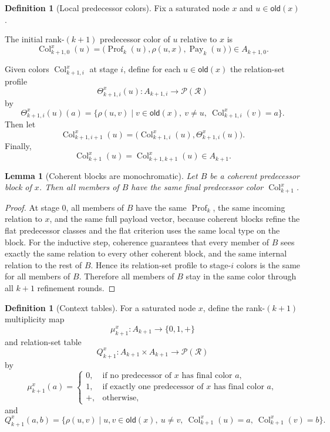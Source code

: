 \documentclass[11pt]{article}
\newtheorem{lemma}[theorem]{Lemma}
\theoremstyle{definition}
\newtheorem{definition}[theorem]{Definition}
\newcommand{\Roles}{\mathcal{R}}
\newcommand{\Prof}{\operatorname{Prof}}
\newcommand{\older}{\mathsf{old}}
\newcommand{\Col}{\operatorname{Col}}
\newcommand{\Pay}{\operatorname{Pay}}
\begin{document}
\begin{definition}[Local predecessor colors]
Fix a saturated node $x$ and $u\in\older(x)$.

The initial rank-$(k+1)$ predecessor color of $u$ relative to $x$ is
\[
\Col^x_{k+1,0}(u)=\bigl(\Prof_k(u),\rho(u,x),\Pay_k(u)\bigr)\in A_{k+1,0}.
\]

Given colors $\Col^x_{k+1,i}$ at stage $i$, define for each $u\in\older(x)$ the relation-set profile
\[
\Theta^x_{k+1,i}(u):A_{k+1,i}\to \mathcal P(\Roles)
\]
by
\[
\Theta^x_{k+1,i}(u)(a)=\{\rho(u,v)\mid v\in\older(x),\ v\neq u,\ \Col^x_{k+1,i}(v)=a\}.
\]
Then let
\[
\Col^x_{k+1,i+1}(u)=\bigl(\Col^x_{k+1,i}(u),\Theta^x_{k+1,i}(u)\bigr).
\]
Finally,
\[
\Col^x_{k+1}(u)=\Col^x_{k+1,k+1}(u)\in A_{k+1}.
\]
\end{definition}

\begin{lemma}[Coherent blocks are monochromatic]
Let $B$ be a coherent predecessor block of $x$. Then all members of $B$ have the same final predecessor color $\Col^x_{k+1}$.
\end{lemma}

\begin{proof}
At stage $0$, all members of $B$ have the same $\Prof_k$, the same incoming relation to $x$, and the same full payload vector, because coherent blocks refine the flat predecessor classes and the flat criterion uses the same local type on the block. For the inductive step, coherence guarantees that every member of $B$ sees exactly the same relation to every other coherent block, and the same internal relation to the rest of $B$. Hence its relation-set profile to stage-$i$ colors is the same for all members of $B$. Therefore all members of $B$ stay in the same color through all $k+1$ refinement rounds.
\end{proof}

\begin{definition}[Context tables]
For a saturated node $x$, define the rank-$(k+1)$ multiplicity map
\[
\mu^x_{k+1}:A_{k+1}\to \{0,1,+\}
\]
and relation-set table
\[
Q^x_{k+1}:A_{k+1}\times A_{k+1}\to \mathcal P(\Roles)
\]
by
\[
\mu^x_{k+1}(a)=\begin{cases}
0,&\text{if no predecessor of }x\text{ has final color }a,\\
1,&\text{if exactly one predecessor of }x\text{ has final color }a,\\
+,&\text{otherwise,}
\end{cases}
\]
and
\[
Q^x_{k+1}(a,b)=\{\rho(u,v)\mid u,v\in\older(x),\ u\neq v,\ \Col^x_{k+1}(u)=a,\ \Col^x_{k+1}(v)=b\}.
\]
\end{definition}
\end{document}
